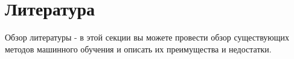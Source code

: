 
\section{Литература}\label{sec:literature}

    Обзор литературы - в этой секции вы можете провести обзор существующих методов машинного обучения и описать их преимущества и недостатки.
